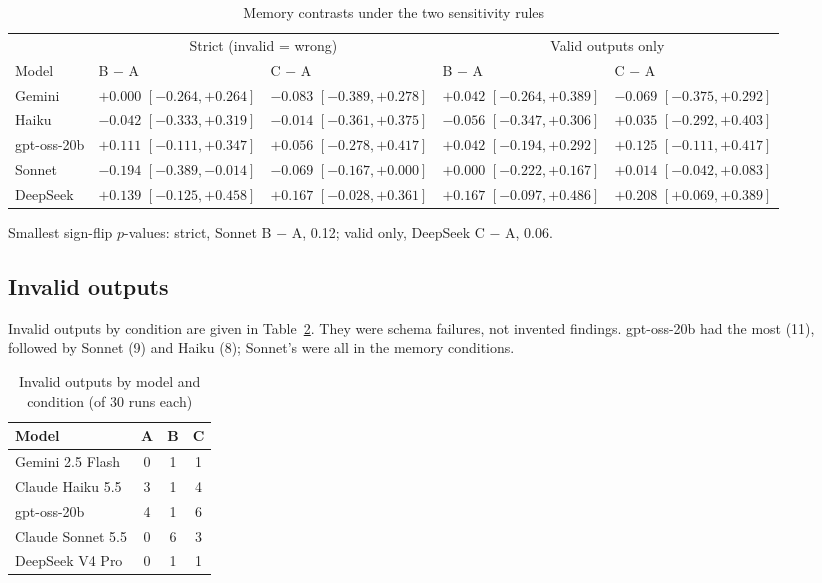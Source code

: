 \documentclass[11pt]{article}
\begin{document}
\begin{table}[ht]
\centering
\caption{Memory contrasts under the two sensitivity rules}
\label{tab:sensitivity}
\small
\begin{tabular}{lllll}
\toprule
 & \multicolumn{2}{c}{Strict (invalid = wrong)} & \multicolumn{2}{c}{Valid outputs only} \\
\cmidrule(lr){2-3}\cmidrule(lr){4-5}
Model & B $-$ A & C $-$ A & B $-$ A & C $-$ A \\
\midrule
Gemini & $+0.000$ $[-0.264, +0.264]$ & $-0.083$ $[-0.389, +0.278]$ & $+0.042$ $[-0.264, +0.389]$ & $-0.069$ $[-0.375, +0.292]$ \\
Haiku & $-0.042$ $[-0.333, +0.319]$ & $-0.014$ $[-0.361, +0.375]$ & $-0.056$ $[-0.347, +0.306]$ & $+0.035$ $[-0.292, +0.403]$ \\
gpt-oss-20b & $+0.111$ $[-0.111, +0.347]$ & $+0.056$ $[-0.278, +0.417]$ & $+0.042$ $[-0.194, +0.292]$ & $+0.125$ $[-0.111, +0.417]$ \\
Sonnet & $-0.194$ $[-0.389, -0.014]$ & $-0.069$ $[-0.167, +0.000]$ & $+0.000$ $[-0.222, +0.167]$ & $+0.014$ $[-0.042, +0.083]$ \\
DeepSeek & $+0.139$ $[-0.125, +0.458]$ & $+0.167$ $[-0.028, +0.361]$ & $+0.167$ $[-0.097, +0.486]$ & $+0.208$ $[+0.069, +0.389]$ \\
\bottomrule
\end{tabular}

\vspace{0.4em}
\begin{minipage}{0.92\linewidth}\footnotesize
Smallest sign-flip $p$-values: strict, Sonnet B $-$ A, 0.12; valid only, DeepSeek C $-$ A, 0.06.
\end{minipage}
\end{table}

\subsection*{Invalid outputs}

Invalid outputs by condition are given in Table~\ref{tab:invalid}. They were schema failures, not invented findings. gpt-oss-20b had the most (11), followed by Sonnet (9) and Haiku (8); Sonnet's were all in the memory conditions.

\begin{table}[ht]
\centering
\caption{Invalid outputs by model and condition (of 30 runs each)}
\label{tab:invalid}
\small
\begin{tabular}{lccc}
\toprule
Model & A & B & C \\
\midrule
Gemini 2.5 Flash & 0 & 1 & 1 \\
Claude Haiku 5.5 & 3 & 1 & 4 \\
gpt-oss-20b & 4 & 1 & 6 \\
Claude Sonnet 5.5 & 0 & 6 & 3 \\
DeepSeek V4 Pro & 0 & 1 & 1 \\
\bottomrule
\end{tabular}
\end{table}
\end{document}
